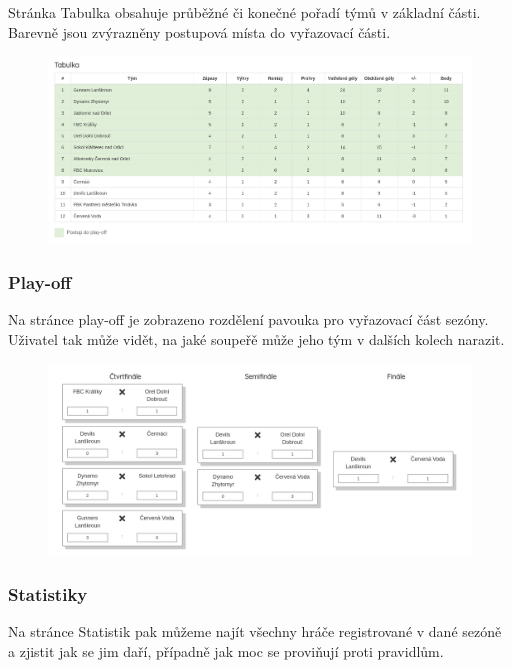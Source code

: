 \documentclass[11pt, a4paper, titlepage]{article}
\begin{document}
Stránka Tabulka obsahuje průběžné či konečné pořadí týmů v základní části. Barevně jsou zvýrazněny postupová místa do vyřazovací části.

\begin{figure}[H]
    \centering
    \includegraphics[width=.8\textwidth]{images/tabulka.png}\hfill
\end{figure}



\subsubsection{Play-off}

Na stránce play-off je zobrazeno rozdělení pavouka pro vyřazovací část sezóny. Uživatel tak může vidět, na jaké soupeřě může jeho tým v dalších kolech narazit.

\begin{figure}[H]
    \centering
    \includegraphics[width=.8\textwidth]{images/play-off.png}\hfill
\end{figure}



\subsubsection{Statistiky}

Na stránce Statistik pak můžeme najít všechny hráče registrované v dané sezóně a zjistit jak se jim daří, případně jak moc se proviňují proti pravidlům.
\end{document}
